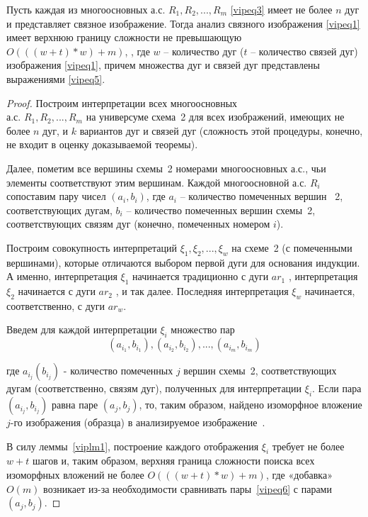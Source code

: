 \begin{theorem}
Пусть каждая из многоосновных а.с. $R_1, R_2, ..., R_m$  \ref{vipeq3} имеет не  более   $n$   дуг и представляет связное изображение. Тогда анализ  связного изображения \ref{vipeq1} имеет верхнюю границу сложности не превышающую $O(((w + t)*w) + m)$,  , где  $w$ -- количество дуг ($t$ -- количество связей дуг) изображения \ref{vipeq1}, причем множества дуг и связей дуг представлены выражениями \ref{vipeq5}.
\end{theorem}
\begin{proof}
Построим интерпретации всех многоосновных\\а.с. $R_1, R_2, ..., R_m$  на универсуме  схема~2 для всех изображений, имеющих не более  $n$ дуг, и  $k$ вариантов дуг и связей дуг (сложность этой процедуры, конечно, не входит в оценку доказываемой теоремы).

Далее, пометим все вершины схемы~2 номерами многоосновных а.с., чьи элементы соответствуют этим вершинам. Каждой многоосновной а.с. $R_i$ сопоставим пару чисел $(a_i, b_i)$, где  $a_i$ – количество помеченных вершин ~2, соответствующих дугам, $b_i$ – количество помеченных вершин схемы~2, соответствующих связям дуг (конечно, помеченных номером $i$).

Построим совокупность интерпретаций $\xi_1, \xi_2, ..., \xi_w$  на  схеме~2 (с помеченными вершинами), которые отличаются выбором первой дуги для основания индукции. А именно, интерпретация $\xi_1$ начинается традиционно с дуги $ar_1$ ,  интерпретация $\xi_2$  начинается с дуги $ar_2$ ,  и так далее. Последняя интерпретация  $\xi_w$ начинается, соответственно, с дуги $ar_w$.

Введем для каждой интерпретации  $\xi_i$     множество пар  
\begin{equation}
(a_{i_1} , b_{i_1} ), (a_{i_2} , b_{i_2} ), ..., (a_{i_m} , b_{i_m} )
\label{vipeq6}
\end{equation}

где  $a_{i_j}(b_{i_j})$  - количество помеченных $j$ вершин схемы~2, соответствующих дугам (соответственно, связям дуг), полученных для интерпретации $\xi_i$. Если пара $(a_{i_j}  ,b_{i_j})$  равна паре  $(a_j, b_j)$, то, таким образом, найдено изоморфное вложение $j$-го изображения (образца)  в анализируемое изображение~\label{vipqe1}.

В силу леммы~\ref{viplm1}, построение каждого отображения $\xi_i$  требует не более  $w + t$ шагов и, таким образом, верхняя граница сложности  поиска всех изоморфных вложений не более  $O(((w + t)*w) + m)$, где «добавка» $O(m)$ возникает из-за необходимости сравнивать пары~\ref{vipeq6} с парами  $(a_j, b_j)$.
\end{proof}

